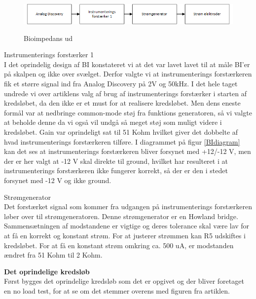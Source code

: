 \documentclass[main.tex]{subfiles}
\begin{document}
\begin{figure}[H]
\centering
{\includegraphics[width=\linewidth]
{Figure/analyse1}}
\caption{Bioimpedans ud}
\label{fig:analyse1}
\end{figure}

Instrumenterings forstærker 1\\
I det oprindelig design af BI konstateret vi at det var lavet lavet til at måle BI'er på skalpen og ikke over svælget. Derfor valgte vi at instrumenterings forstærkeren fik et større signal ind fra Analog Discovery på 2V og 50kHz. I det hele taget undrede vi over artiklens valg af brug af instrumenterings forstærker i starten af kredsløbet, da den ikke er et must for at realisere kredsløbet. Men dens eneste formål var at nedbringe common-mode støj fra funktions generatoren, så vi valgte at beholde denne da vi også vil undgå så meget støj som muligt videre i kredsløbet. Gain var oprindeligt sat til 51 Kohm hvilket giver det dobbelte af hvad instrumenterings forstærkeren tilføre. I diagrammet på figur \ref{BIdiagram} kan det ses at instrumenterings forstærkeren bliver forsynet med +12/-12 V, men der er her valgt at -12 V skal direkte til ground, hvilket har resulteret i at instrumenterings forstærkeren ikke fungerer korrekt, så der er den i stedet forsynet med -12 V og ikke ground.  





Strømgenerator\\
Det forstærket signal som kommer fra udgangen på instrumenterings forstærkeren løber over til strømgeneratoren. Denne strømgenerator er en Howland bridge. Sammensætningen af modstandene er vigtige og deres tolerance skal være lav for at få en korrekt og konstant strøm. For at justerer strømmen kan R5 udskiftes i kredsløbet. For at få en konstant strøm omkring ca. 500 uA, er modstanden ændret fra 51 Kohm til 2 Kohm.  

\textbf{Det oprindelige kredsløb}\\
Først bygges det oprindelige kredsløb som det er opgivet og der bliver foretaget en no load test, for at se om det stemmer overens med figuren fra artiklen.
\end{document}
